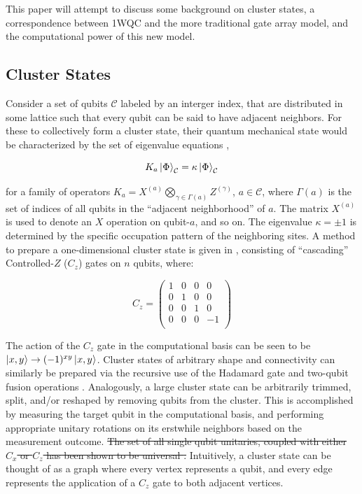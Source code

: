 \documentclass[twocolumn]{IEEEtran11}
\newcommand{\clb}{\color{blue}}
\newcommand{\clr}{\color{myRed}}
\newcommand{\clbl}{\color{black}}
\begin{document}
This paper will attempt to discuss some background on cluster states, a correspondence between 1WQC and the more traditional gate array model, and the computational power of this new model.

\subsection{Cluster States}
\clb Consider a set of qubits $\mathcal{C}$ labeled by an interger index, that are distributed in some lattice such that every qubit can be said to have adjacent neighbors. For these to collectively form a cluster state, their quantum mechanical state would be characterized by the set of eigenvalue equations \cite{briegel2001persistent},

\begin{equation}
  K_a\left|\mspace{0.5mu} \Phi \mspace{0.5mu}\right\rangle_{\mathcal{C}}= \kappa\left|\mspace{0.5mu} \Phi \mspace{0.5mu}\right\rangle_{\mathcal{C}}
\end{equation}

\noindent for a family of operators $K_a = X^{(a)}\bigotimes_{\gamma\in\Gamma(a)}Z^{(\gamma)}$, $a\in\mathcal{C}$, where $\Gamma(a)$ is the set of indices of all qubits in the ``adjacent neighborhood'' of $a$. The matrix $X^{(a)}$ is used to denote an $X$ operation on qubit-$a$, and so on. The eigenvalue $\kappa = \pm 1$ is determined by the specific occupation pattern of the neighboring sites. \clbl A method to prepare a one-dimensional cluster state is given in \cite{jorrand2005unifying}, consisting of ``cascading'' Controlled-$Z$ ($C_z$) gates on $n$ qubits, where:

\[
C_z = 
\begin{pmatrix}
  1 & 0 & 0 & 0 \\
  0 & 1 & 0 & 0 \\
  0 & 0 & 1 & 0 \\
  0 & 0 & 0 & -1 \\
 \end{pmatrix}
\]

The action of the $C_z$ gate in the computational basis can be seen to be $\left|\mspace{0.5mu} x,y \mspace{0.5mu}\right\rangle \to (-1)^{xy}\left|\mspace{0.5mu} x,y \mspace{0.5mu}\right\rangle$. \clb Cluster states of arbitrary shape and connectivity can similarly be prepared via the recursive use of the Hadamard gate and two-qubit fusion operations \cite{browne2005efficient,gerald2006efficient}. Analogously, a large cluster state can be arbitrarily trimmed, split, and/or reshaped by removing qubits from the cluster. This is accomplished by measuring the target qubit in the computational basis, and performing appropriate unitary rotations on its erstwhile neighbors based on the measurement outcome. \clr \sout{The set of all single qubit unitaries, coupled with either $C_x$ or $C_z$ has been shown to be universal \cite{brylinski2002universal}.} \clbl Intuitively, a cluster state can be thought of as a graph where every vertex represents a qubit, and every edge represents the application of a $C_z$ gate to both adjacent vertices.
\end{document}
